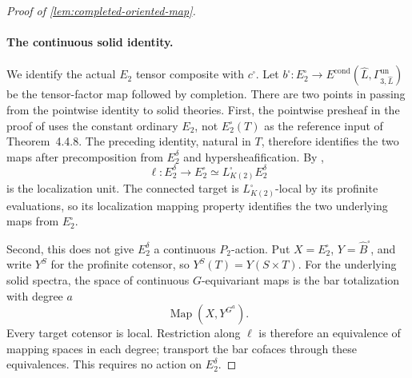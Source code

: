 \documentclass[11pt]{article}
\numberwithin{equation}{section}
\theoremstyle{definition}
\theoremstyle{remark}
\begin{document}
\begin{proof}[Proof of \cref{lem:completed-oriented-map}]
\paragraph{The continuous solid identity.}
We identify the actual \(E_2\) tensor composite with \(c^\square\).
Let \(b^\square:E_2^\square\to
E^{\mathrm{cond}}(\widehat L,\Gamma^{\mathrm{un}}_{3,\widehat L})\)
be the tensor-factor map followed by completion. There are two points in
passing from the pointwise identity to solid theories. First,
the pointwise presheaf in the proof of
\cite[Proposition~4.5.12]{BMR2026} uses the constant ordinary \(E_2\), not \(E_2^\square(T)\) as the reference input
of Theorem~4.4.8. The preceding identity, natural in \(T\), therefore
identifies the two maps after precomposition from \(E_2^\delta\) and
hypersheafification. By \cite[Lemma~4.5.8]{BMR2026},
\[
 \ell:E_2^\delta\longrightarrow E_2^\square
       \simeq L^\square_{K(2)}E_2^\delta
\]
is the localization unit. The connected target is
\(L^\square_{K(2)}\)-local by its profinite evaluations, so its localization
mapping property identifies the two underlying maps from \(E_2^\square\).

Second, this does not give \(E_2^\delta\) a continuous \(P_2\)-action.
Put \(X=E_2^\square\), \(Y=\widehat B^\square\), and write \(Y^S\) for the
profinite cotensor, so \(Y^S(T)=Y(S\times T)\). For the underlying solid
spectra, the space of continuous \(G\)-equivariant maps is the bar
totalization with degree \(a\)
\[
 \operatorname{Map}(X,Y^{G^a}).
\]
Every target cotensor is local. Restriction along \(\ell\) is therefore
an equivalence of mapping spaces in each degree; transport the bar cofaces
through these equivalences. This requires no action on \(E_2^\delta\).


\end{proof}
\end{document}
